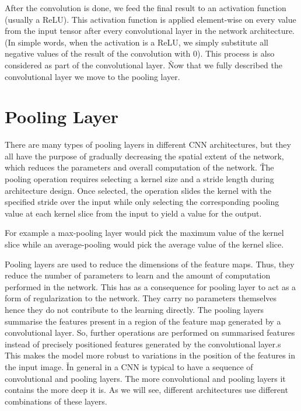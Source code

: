 After the convolution is done, we feed the final result to an activation function (usually a ReLU). This activation
function is applied element-wise on every value from the input tensor after every convolutional layer in the network
architecture. (In simple words, when the activation is a ReLU, we simply substitute all negative values of the result
of the convolution with 0). This process is also considered as part of the convolutional layer. \v

Now that we fully described the convolutional layer we move to the pooling layer.

\section{Pooling Layer}

There are many types of pooling layers in different CNN architectures, but they all have the purpose of gradually
decreasing the spatial extent of the network, which reduces the parameters and overall computation of the network. \v

The pooling operation requires selecting a kernel size and a stride length during architecture design. Once selected,
the operation slides the kernel with the specified stride over the input while only selecting the corresponding
pooling value at each kernel slice from the input to yield a value for the output.

\be
For example a max-pooling layer would pick the maximum value of the kernel slice while an average-pooling would pick
the average value of the kernel slice.

\ee

Pooling layers are used to reduce the dimensions of the feature maps. Thus, they reduce the number of parameters to
learn and the amount of computation performed in the network. This has as a consequence for pooling layer to act as a
form of regularization to the network. They carry no parameters themselves hence they do not contribute to the
learning directly. The pooling layers summarise the features present in a region of the feature map generated by a
convolutional layer. So, further operations are performed on summarised features instead of precisely positioned
features generated by the convolutional layer.s This makes the model more robust to variations in the position of the
features in the input image. \v

In general in a CNN is typical to have a sequence of convolutional and pooling layers. The more convolutional and
pooling layers it contains the more deep it is. As we will see, different architectures use different combinations of
these layers.

